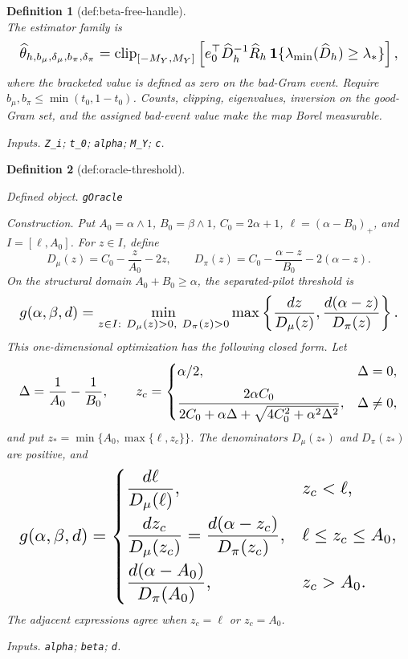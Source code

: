 \documentclass{article}
\newtheorem{definition}{Definition}
\begin{document}
\begin{definition}[def:beta-free-handle]
\[\]
The estimator family is
\[
\makebox[\linewidth][c]{\resizebox{0.98\linewidth}{!}{\(\displaystyle \widehat\theta_{h,b_\mu,\delta_\mu,b_\pi,\delta_\pi}
=\operatorname{clip}_{[-M_Y,M_Y]}\left[e_0^\top\widehat D_h^{-1}\widehat R_h\,\mathbf 1\{\lambda_{\min}(\widehat D_h)\ge\lambda_*\}\right],\)}}
\]
where the bracketed value is defined as zero on the bad-Gram event. Require \(b_\mu,b_\pi\le\min(t_0,1-t_0)\). Counts, clipping, eigenvalues, inversion on the good-Gram set, and the assigned bad-event value make the map Borel measurable.
\par\smallskip\noindent\emph{Inputs.} \texttt{Z\_\allowbreak{}i}; \texttt{t\_\allowbreak{}0}; \texttt{alpha}; \texttt{M\_\allowbreak{}Y}; \texttt{c}.
\end{definition}

\begin{definition}[def:oracle-threshold]\label{def:oracle-threshold}
\par\smallskip\noindent\emph{Defined object.} \texttt{gOracle}
\par\smallskip\noindent\emph{Construction.} Put \(A_0=\alpha\wedge1\), \(B_0=\beta\wedge1\), \(C_0=2\alpha+1\), \(\ell=(\alpha-B_0)_+\), and \(I=[\ell,A_0]\). For \(z\in I\), define
\[
D_\mu(z)=C_0-\frac{z}{A_0}-2z,
\qquad
D_\pi(z)=C_0-\frac{\alpha-z}{B_0}-2(\alpha-z).
\]
On the structural domain \(A_0+B_0\ge\alpha\), the separated-pilot threshold is
\[
\makebox[\linewidth][c]{\resizebox{0.98\linewidth}{!}{\(\displaystyle g(\alpha,\beta,d)
=
\min_{\substack{z\in I:\ D_\mu(z)>0,\ D_\pi(z)>0}}
\max\left\{
\frac{dz}{D_\mu(z)},
\frac{d(\alpha-z)}{D_\pi(z)}
\right\}.\)}}
\]
This one-dimensional optimization has the following closed form. Let
\[
\makebox[\linewidth][c]{\resizebox{0.98\linewidth}{!}{\(\displaystyle \Delta=\frac1{A_0}-\frac1{B_0},
\qquad
z_c=
\begin{cases}
\alpha/2,&\Delta=0,\\[2mm]
\displaystyle
\frac{2\alpha C_0}{2C_0+\alpha\Delta+\sqrt{4C_0^2+\alpha^2\Delta^2}},&\Delta\ne0,
\end{cases}\)}}
\]
and put \(z_*=\min\{A_0,\max\{\ell,z_c\}\}\). The denominators \(D_\mu(z_*)\) and \(D_\pi(z_*)\) are positive, and
\[
\makebox[\linewidth][c]{\resizebox{0.98\linewidth}{!}{\(\displaystyle g(\alpha,\beta,d)=
\begin{cases}
\displaystyle \frac{d\ell}{D_\mu(\ell)},&z_c<\ell,\\[3mm]
\displaystyle \frac{dz_c}{D_\mu(z_c)}
=\frac{d(\alpha-z_c)}{D_\pi(z_c)},&\ell\le z_c\le A_0,\\[3mm]
\displaystyle \frac{d(\alpha-A_0)}{D_\pi(A_0)},&z_c>A_0.
\end{cases}\)}}
\]
The adjacent expressions agree when \(z_c=\ell\) or \(z_c=A_0\).
\par\smallskip\noindent\emph{Inputs.} \texttt{alpha}; \texttt{beta}; \texttt{d}.
\end{definition}
\end{document}

